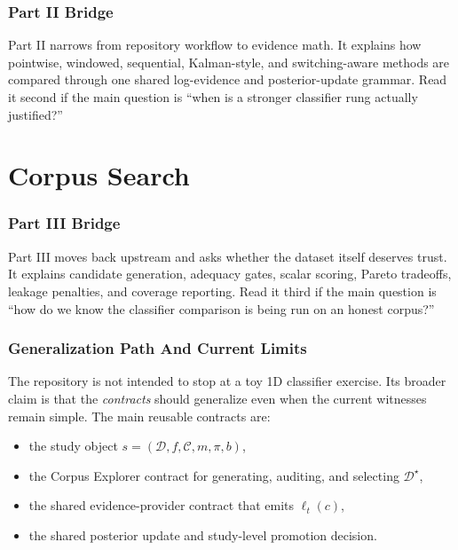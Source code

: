 \documentclass[11pt]{article}
\begin{document}
\section*{Part II Bridge}
Part II narrows from repository workflow to evidence math. It explains how pointwise, windowed, sequential, Kalman-style, and switching-aware methods are compared through one shared log-evidence and posterior-update grammar. Read it second if the main question is ``when is a stronger classifier rung actually justified?''

\begingroup
\let\maketitle\relax
{}

\endgroup

\part{Corpus Search}
\section*{Part III Bridge}
Part III moves back upstream and asks whether the dataset itself deserves trust. It explains candidate generation, adequacy gates, scalar scoring, Pareto tradeoffs, leakage penalties, and coverage reporting. Read it third if the main question is ``how do we know the classifier comparison is being run on an honest corpus?''

\begingroup
\let\maketitle\relax
{}

\endgroup

\clearpage
\section{Generalization Path And Current Limits}
The repository is not intended to stop at a toy 1D classifier exercise. Its broader claim is that the \emph{contracts} should generalize even when the current witnesses remain simple. The main reusable contracts are:
\begin{itemize}[leftmargin=1.5em]
  \item the study object \(s = (\mathcal{D}, f, \mathcal{C}, m, \pi, b)\),
  \item the Corpus Explorer contract for generating, auditing, and selecting \(\mathcal{D}^{\star}\),
  \item the shared evidence-provider contract that emits \(\ell_t(c)\),
  \item the shared posterior update and study-level promotion decision.
\end{itemize}
\end{document}
